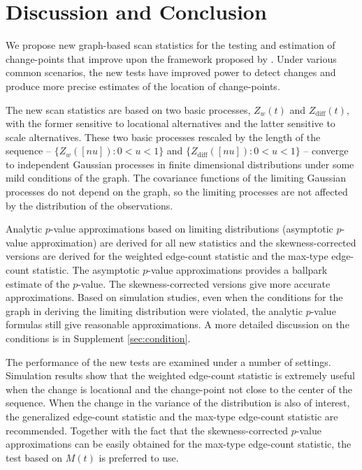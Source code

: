 \documentclass[arxiv, preprint]{imsart}
\numberwithin{equation}{section}
\theoremstyle{plain}
\begin{document}
\section{Discussion and Conclusion}
\label{sec:8}

We propose new graph-based scan statistics for the testing and estimation of change-points that improve upon the framework proposed by \cite{chen2015graph}. Under various common scenarios, the new tests have improved power to detect changes and produce more precise estimates of the location of change-points.  

The new scan statistics are based on two basic processes, $Z_w(t)$ and $Z_\text{diff}(t)$, with the former sensitive to locational alternatives and the latter sensitive to scale alternatives.  These two basic processes rescaled by the length of the sequence -- $\{Z_w([nu]): 0<u<1\}$ and $\{Z_\text{diff}([nu]):0<u<1\}$ -- converge to independent Gaussian processes in finite dimensional distributions under some mild conditions of the graph.  The covariance functions of the limiting Gaussian processes do not depend on the graph, so the limiting processes are not affected by the distribution of the observations. 

Analytic $p$-value approximations based on limiting distributions (asymptotic $p$-value approximation) are derived for all new statistics and the skewness-corrected versions are derived for the weighted edge-count statistic and the max-type edge-count statistic.  The asymptotic $p$-value approximations provides a ballpark estimate of the $p$-value.  The skewness-corrected versions give more accurate approximations.  Based on simulation studies, even when the conditions for the graph in deriving the limiting distribution were violated, the analytic $p$-value formulas still give reasonable approximations.  A more detailed discussion on the conditions is in Supplement  \ref{sec:condition}. %


The performance of the new tests are examined under a number of settings.  Simulation results show that the weighted edge-count statistic is extremely useful when the change is locational and  the change-point not close to the center of the sequence.  When the change in the variance of the distribution is also of interest, the generalized edge-count statistic and the max-type edge-count statistic are recommended.   Together with the fact that the skewness-corrected $p$-value approximations can be easily obtained for the max-type edge-count statistic,  the test based on $M(t)$ is preferred to use. 
\end{document}
